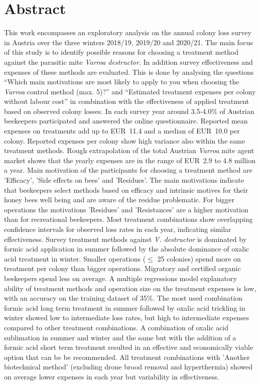 \chapter*{Abstract}
\label{sec:abstract}
\vspace*{-15mm}

This work encompasses an exploratory analysis on the annual colony loss survey in Austria over the three winters 2018/19, 2019/20 and 2020/21. The main focus of this study is to identify possible reasons for choosing a treatment method against the parasitic mite \textit{Varroa destructor}. In addition survey effectiveness and expenses of these methods are evaluated. This is done by analysing the questions \enquote{Which main motivations are most likely to apply to you when choosing the \textit{Varroa} control method (max. 5)?} and \enquote{Estimated treatment expenses per colony without labour cost} in combination with the effectiveness of applied treatment based on observed colony losses. In each survey year around 3.5-4.0\% of Austrian beekeepers participated and answered the online questionnaire. Reported mean expenses on treatments add up to EUR~11.4 and a median of EUR~10.0 per colony. Reported expenses per colony show high variance also within the same treatment methods. Rough extrapolation of the total Austrian \textit{Varroa} mite agent market shows that the yearly expenses are in the range of EUR~2.9 to 4.8 million a year. Main motivation of the participants for choosing a treatment method are 'Efficacy', 'Side effects on bees' and 'Residues'. The main motivations indicate that beekeepers select methods based on efficacy and intrinsic motives for their honey bees well being and are aware of the residue problematic. For bigger operations the motivations 'Residues' and 'Resistances' are a higher motivation than for recreational beekeepers. Most treatment combinations show overlapping confidence intervals for observed loss rates in each year, indicating similar effectiveness. Survey treatment methods against \textit{V. destructor} is dominated by formic acid application in summer followed by the absolute dominance of oxalic acid treatment in winter. Smaller operations ($\leq$ 25 colonies) spend more on treatment per colony than bigger operations. Migratory and certified organic beekeepers spend less on average. A multiple regressions model explanatory ability of treatment methods and operation size on the treatment expenses is low, with an accuracy on the training dataset of 35\%. The most used combination formic acid long term treatment in summer followed by oxalic acid trickling in winter showed low to intermediate loss rates, but high to intermediate expenses compared to other treatment combinations. A combination of oxalic acid sublimation in summer and winter and the same but with the addition of a formic acid short term treatment resulted in an effective and economically viable option that can be be recommended. All treatment combinations with 'Another biotechnical method' (excluding drone brood removal and hyperthermia) showed on average lower expenses in each year but variability in effectiveness.
